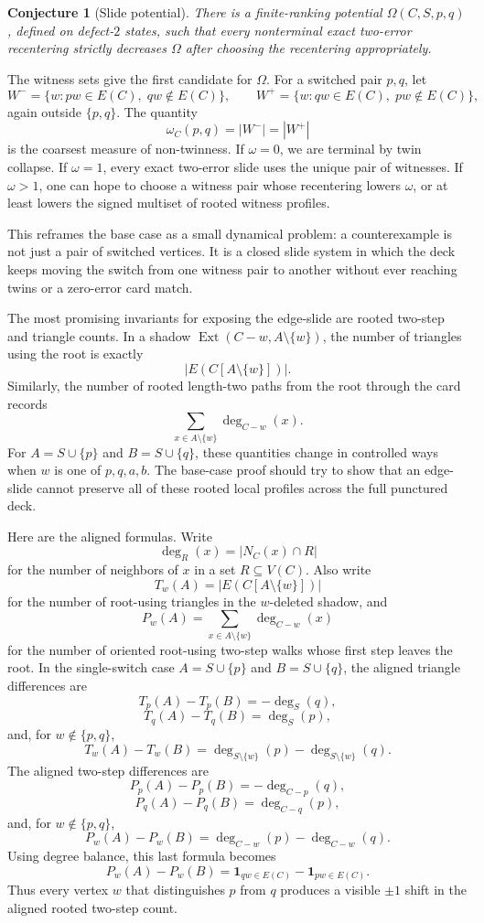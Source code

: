 \documentclass[11pt]{article}
\newtheorem{conjecture}{Conjecture}
\newcommand{\Ext}{\operatorname{Ext}}
\newcommand{\one}{\mathbf{1}}
\begin{document}
\begin{conjecture}[Slide potential]
There is a finite-ranking potential \(\Omega(C,S,p,q)\), defined on
defect-\(2\) states, such that every nonterminal exact two-error recentering
strictly decreases \(\Omega\) after choosing the recentering appropriately.
\end{conjecture}

The witness sets give the first candidate for \(\Omega\).  For a switched
pair \(p,q\), let
\[
  W^-=\{w: pw\in E(C),\;qw\notin E(C)\},
  \qquad
  W^+=\{w: qw\in E(C),\;pw\notin E(C)\},
\]
again outside \(\{p,q\}\).  The quantity
\[
  \omega_C(p,q)=|W^-|=|W^+|
\]
is the coarsest measure of non-twinness.  If \(\omega=0\), we are terminal by
twin collapse.  If \(\omega=1\), every exact two-error slide uses the unique
pair of witnesses.  If \(\omega>1\), one can hope to choose a witness pair
whose recentering lowers \(\omega\), or at least lowers the signed multiset of
rooted witness profiles.

This reframes the base case as a small dynamical problem: a counterexample is
not just a pair of switched vertices.  It is a closed slide system in which
the deck keeps moving the switch from one witness pair to another without ever
reaching twins or a zero-error card match.

The most promising invariants for exposing the edge-slide are rooted
two-step and triangle counts.  In a shadow \(\Ext(C-w,A\setminus\{w\})\),
the number of triangles using the root is exactly
\[
  |E(C[A\setminus\{w\}])|.
\]
Similarly, the number of rooted length-two paths from the root through the
card records
\[
  \sum_{x\in A\setminus\{w\}} \deg_{C-w}(x).
\]
For \(A=S\cup\{p\}\) and \(B=S\cup\{q\}\), these quantities change in
controlled ways when \(w\) is one of \(p,q,a,b\).  The base-case proof should
try to show that an edge-slide cannot preserve all of these rooted local
profiles across the full punctured deck.

Here are the aligned formulas.  Write
\[
  \deg_R(x)=|N_C(x)\cap R|
\]
for the number of neighbors of \(x\) in a set \(R\subseteq V(C)\).  Also write
\[
  T_w(A)=|E(C[A\setminus\{w\}])|
\]
for the number of root-using triangles in the \(w\)-deleted shadow, and
\[
  P_w(A)=\sum_{x\in A\setminus\{w\}}\deg_{C-w}(x)
\]
for the number of oriented root-using two-step walks whose first step leaves
the root.  In the single-switch case \(A=S\cup\{p\}\) and
\(B=S\cup\{q\}\), the aligned triangle differences are
\[
  T_p(A)-T_p(B)=-\deg_S(q),
\]
\[
  T_q(A)-T_q(B)=\deg_S(p),
\]
and, for \(w\notin\{p,q\}\),
\[
  T_w(A)-T_w(B)
  =
  \deg_{S\setminus\{w\}}(p)
  -
  \deg_{S\setminus\{w\}}(q).
\]
The aligned two-step differences are
\[
  P_p(A)-P_p(B)=-\deg_{C-p}(q),
\]
\[
  P_q(A)-P_q(B)=\deg_{C-q}(p),
\]
and, for \(w\notin\{p,q\}\),
\[
  P_w(A)-P_w(B)=\deg_{C-w}(p)-\deg_{C-w}(q).
\]
Using degree balance, this last formula becomes
\[
  P_w(A)-P_w(B)
  =
  \one_{qw\in E(C)}-\one_{pw\in E(C)}.
\]
Thus every vertex \(w\) that distinguishes \(p\) from \(q\) produces a
visible \(\pm 1\) shift in the aligned rooted two-step count.
\end{document}
